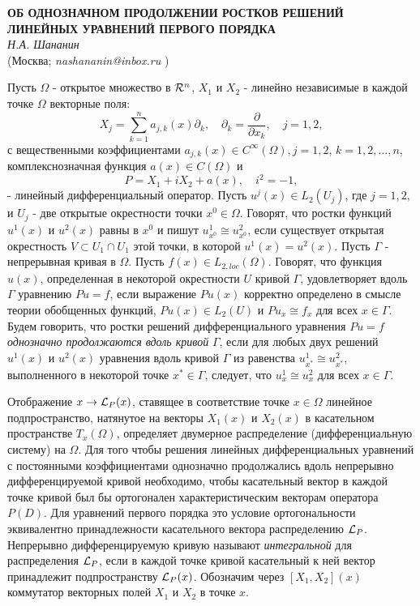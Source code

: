 \begin{center}{ \bf  ОБ ОДНОЗНАЧНОМ ПРОДОЛЖЕНИИ РОСТКОВ РЕШЕНИЙ ЛИНЕЙНЫХ УРАВНЕНИЙ ПЕРВОГО ПОРЯДКА}\\
{\it Н.А. Шананин } \\
(Москва; {\it nashananin@inbox.ru} )
\end{center}



Пусть $ \Omega$ - открытое множество в ${\cal R}^n$, $X_1$ и $X_2$ - линейно независимые в каждой точке $ \Omega$ векторные поля:
$$
X_j=\sum_{k=1}^na_{j, k}(x)\partial_k,\quad \partial_k=\frac{\partial}{\partial x_k},\quad j=1,2,
$$
с вещественными  коэффициентами $a_{j,k}(x)\in C^{\infty}(\Omega), j=1,2$, $k=1, 2,\dots, n$, комплекснозначная  функция $a(x)\in C(\Omega)$ и
$$
P=X_1+iX_2+a(x), \quad i^2=-1,
$$
- линейный дифференциальный оператор. Пусть $u^j(x)\in L_{2}(U_j)$, где $j=1, 2,$ и $U_j$ - две открытые окрестности точки  $x^0\in \Omega$. Говорят, что ростки  функций $u^1(x)$ и  $u^2(x)$  равны в $x^0$ и пишут  $u_{x^0}^1\cong u_{x^0}^2$, если существует открытая окрестность $V\subset U_1\cap U_1$ этой точки, в которой $u^1(x)=u^2(x)$. Пусть $\Gamma$ - непрерывная кривая в $ \Omega$. Пусть $f(x)\in L_{2, loc}(\Omega)$. Говорят, что функция $u(x)$, определенная в некоторой окрестности $U$ кривой $\Gamma$,  удовлетворяет вдоль $\Gamma$
 уравнению $Pu=f$, если выражение $Pu(x)$ корректно определено в смысле теории обобщенных функций, $Pu(x)\in L_{2}(U)$ и  $Pu_x\cong f_x$ для всех $x\in\Gamma$.
Будем говорить, что ростки решений дифференциального уравнения
$
Pu=f
$
{\it однозначно продолжаются вдоль кривой} $\Gamma$, если для любых двух решений $u^1(x)$ и $u^2(x)$ уравнения вдоль кривой $\Gamma$  из равенства $u^1_{x^{\ast}}\cong u^2_{x^{\ast}}$, выполненного в некоторой точке $x^{\ast}\in\Gamma$,   следует, что $u^1_x\cong u^2_x$ для всех $x\in\Gamma$.

Отображение $x\to {\cal L}_P(x)$, ставящее в соответствие точке $x\in \Omega$
линейное подпространство, натянутое на векторы $X_1(x)$ и $X_2(x)$ в касательном пространстве  $T_x(\Omega)$, определяет двумерное  распределение (дифференциальную систему) на $\Omega$.
Для того чтобы решения линейных дифференциальных уравнений с постоянными коэффициентами
однозначно продолжались вдоль непрерывно дифференцируемой кривой необходимо, чтобы касательный вектор в каждой точке кривой был бы ортогонален характеристическим векторам оператора $P(D)$. Для уравнений первого порядка это условие ортогональности эквивалентно принадлежности касательного вектора распределению ${\cal L}_P$.
Непрерывно дифференцируемую кривую называют {\it интегральной}  для распределения ${\cal L}_P$, если в каждой точке  кривой
касательный  к ней  вектор принадлежит подпространству ${\cal L}_P(x)$.
Обозначим через $[X_1, X_2](x)$ коммутатор векторных полей $X_1$ и $X_2$ в точке $x$.

